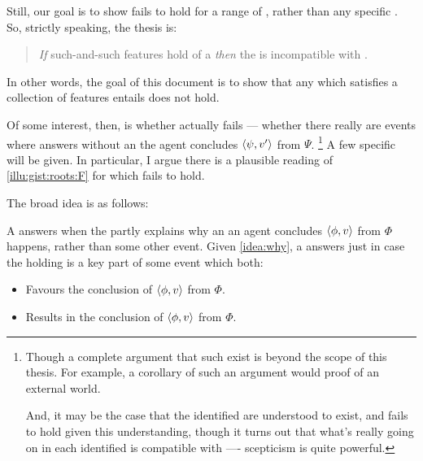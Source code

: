 \begin{note}
  Still, our goal is to show \issueInclusion{} fails to hold for a range of , rather than any specific .
  So, strictly speaking, the thesis is:
  \begin{quote}
    \emph{If} such-and-such features hold of a \scen{} \emph{then} the \scen{} is incompatible with \issueInclusion{}.
  \end{quote}
  In other words, the goal of this document is to show that any  which satisfies a collection of features entails \issueInclusion{} does not hold.

  Of some interest, then, is whether \issueInclusion{} actually fails --- whether there really are events where  answers \qWhy{} without an  the agent concludes \(\langle\psi, v'\rangle\) from \(\Psi\).%
  \footnote{
    Though a complete argument that such  exist is beyond the scope of this thesis.
    For example, a corollary of such an argument would proof of an external world.

    And, it may be the case that the  identified are understood to exist, and \issueInclusion{} fails to hold given this understanding, though it turns out that what's really going on in each  identified is compatible with \issueInclusion{} ---- scepticism is quite powerful.
  }
  A few specific  will be given.
  In particular, I argue there is a plausible reading of \autoref{illu:gist:roots:F} for which \issueInclusion{} fails to hold.
\end{note}


\begin{note}
  The broad idea is as follows:

  A \fingfr{} answers \qWhy{} when the \fingfr{} partly explains why an  an agent concludes \(\langle\phi, v\rangle\) from \(\Phi\) happens, rather than some other event.
  Given \autoref{idea:why}, a \fingfr{} answers \qWhy{} just in case the \fingfr{} holding is a key part of some event which both:
  \begin{itemize}
  \item
    Favours the \agents{} conclusion of \(\langle\phi, v\rangle\) from \(\Phi\).
  \item
    Results in the \agents{} conclusion of \(\langle\phi, v\rangle\) from \(\Phi\).
  \end{itemize}
\end{note}


